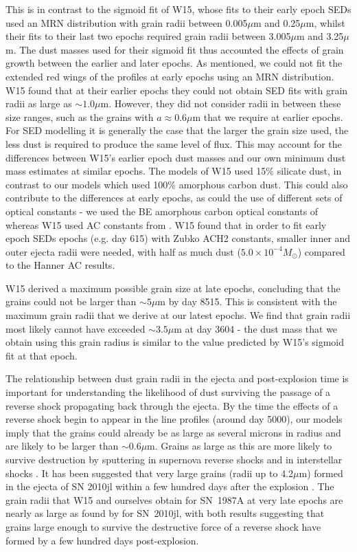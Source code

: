 \documentclass[useAMS,usenatbib,usegraphicx]{mnras}
\begin{document}
This is in contrast to the sigmoid fit of W15, whose fits to their early 
epoch SEDs used an MRN distribution with grain radii between 0.005$\mu$m 
and 0.25$\mu$m, whilst their fits to their last two epochs required grain 
radii between 3.005$\mu$m and 3.25$\mu$m. The dust masses used for their 
sigmoid fit thus accounted the effects of grain growth between the earlier 
and later epochs. As mentioned, we could not fit the extended red wings of 
the profiles at early epochs using an MRN distribution.  W15 found that at 
their earlier epochs they could not obtain SED fits with grain radii as 
large as $\sim 1.0 \mu$m. However, they did not consider radii in between 
these size ranges, such as the grains with $a \approx 0.6\mu$m that we 
require at earlier epochs.  For SED modelling it is generally the case that 
the larger the grain size used, the less dust is required to produce the 
same level of flux.  This may account for the differences between W15's 
earlier epoch dust masses and our own minimum dust mass estimates at 
similar epochs.  The models of W15 used 15\% silicate dust, in contrast to 
our models which used 100\% amorphous carbon dust.  This could also 
contribute to the differences at early epochs, as could the use of 
different sets of optical constants - we used the BE amorphous carbon 
optical constants of \citet{Zubko1996} whereas W15 used AC constants from 
\citet{Hanner1988}.  W15 found that in order to fit early epoch SEDs epochs 
(e.g. day 615) with Zubko ACH2 constants, smaller inner and outer ejecta 
radii were needed, with half as much dust ($5.0 \times 10^{-4}M_{\odot}$) 
compared to the Hanner AC results.

W15 derived a maximum possible grain size at late epochs, concluding
that the grains could not be larger than $\sim 5\mu$m by day 8515. This 
is consistent with the maximum grain radii that we derive at our latest
epochs.  We find that grain radii most likely cannot have exceeded 
$\sim 3.5\mu$m at day 3604 - the dust mass that we obtain using this grain 
radius is similar to the value predicted by W15's sigmoid fit at that
epoch.

The relationship between dust grain radii in the ejecta and post-explosion 
time is important for understanding the likelihood of dust surviving the 
passage of a reverse shock propagating back through the ejecta. By the 
time the effects of a reverse shock begin to appear in the line profiles 
(around day 5000), our models imply that the grains could already be as 
large as several microns in radius and are likely to be larger than $\sim 
0.6\mu$m. Grains as large as this are more likely to survive destruction 
by sputtering in supernova reverse shocks and in interstellar shocks 
\citep{Silvia2010, Silvia2012, Slavin2015}.
It has been suggested that very large grains (radii up to 4.2$\mu$m) 
formed in the ejecta of SN 2010jl within a few hundred days after the 
explosion \cite{Gall2014}. The grain radii that W15 and ourselves obtain 
for SN~1987A at very late epochs are nearly as large as found by 
\citet{Gall2014} for SN~2010jl, with both results suggesting that grains 
large enough to survive the destructive force of a reverse shock have 
formed by a few hundred days post-explosion. 
\end{document}
